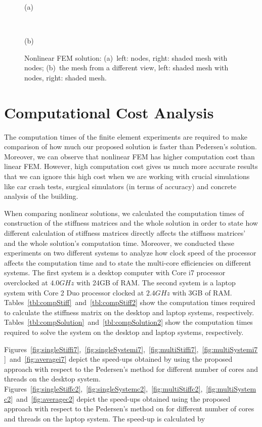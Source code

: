 \begin{figure}[h]
\centerline{}
\centerline{(a)}
\centerline{\ }
\centerline{}
\centerline{(b)}
\caption{Nonlinear FEM solution: (a)~left: nodes, right: shaded mesh with nodes; (b)~the mesh from a different view, left: shaded mesh with nodes, right: shaded mesh.}
\label{fig:fig40_41}
\end{figure}

\clearpage
\section{Computational Cost Analysis}

The computation times of the finite element experiments are required to make comparison of how much our proposed solution is faster than Pedersen's solution. Moreover, we can observe that nonlinear FEM has higher computation cost than linear FEM. However, high computation cost gives us much more accurate results that we can ignore this high cost when we are working with crucial simulations like car crash tests, surgical simulators (in terms of accuracy) and concrete analysis of the building.

When comparing nonlinear solutions, we calculated the computation times of construction of the stiffness matrices and the whole solution in order to state how different calculation of stiffness matrices directly affects the stiffness matrices' and the whole solution's computation time. Moreover, we conducted these experiments on two different systems to analyze how clock speed of the processor affects the computation time and to state the multi-core efficiencies on different systems. The first system is a desktop computer with Core i7 processor overclocked at $4.0GHz$ with 24GB of RAM. The second system is a laptop system with Core 2 Duo processor clocked at $2.4GHz$ with 3GB of RAM. Tables~\ref{tbl:compStiff}~and~\ref{tbl:compStiff2} show the computation times required to calculate the stiffness matrix on the desktop and laptop systems, respectively. Tables~\ref{tbl:compSolution}~and~\ref{tbl:compSolution2} show the computation times required to solve the system on the desktop and laptop systems, respectively.

Figures~\ref{fig:singleStiffi7},~\ref{fig:singleSystemi7},~\ref{fig:multiStiffi7},~\ref{fig:multiSystemi7}~and~\ref{fig:averagei7} depict the speed-ups obtained by using the proposed approach with respect to the Pedersen's method for different number of cores and threads on the desktop system. Figures~\ref{fig:singleStiffc2},~\ref{fig:singleSystemc2},~\ref{fig:multiStiffc2},~\ref{fig:multiSystemc2}~and~\ref{fig:averagec2} depict the speed-ups obtained using the proposed approach with respect to the Pedersen's method on for different number of cores and threads on the laptop system. The speed-up is calculated by

